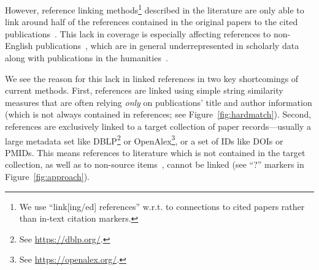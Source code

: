 However, reference linking methods\footnote{We use ``link[ing/ed] references'' w.r.t. to connections to cited papers rather than in-text citation markers.} described in the literature are only able to link around half of the references contained in the original papers to the cited publications~\cite{Lo2020,Saier2020}. This lack in coverage is especially affecting references to non-English publications~\cite{Saier2021}, which are in general underrepresented in scholarly data~\cite{Vera-Baceta2019,Liu2019,Moed2018,Moskaleva2019} along with publications in the humanities~\cite{Colavizza2019,Kellsey2004}.

We see the reason for this lack in linked references in two key shortcomings of current methods.
First, references are linked using simple string similarity measures that are often relying \emph{only} on publications' title and author information (which is not always contained in references; see Figure~\ref{fig:hardmatch}). %
Second, references are exclusively linked to a target collection of paper records---usually a large metadata set like DBLP\footnote{See \url{https://dblp.org/}.} or OpenAlex\footnote{See \url{https://openalex.org/}.}, or a set of IDs like DOIs or PMIDs. This means references to literature which is not contained in the target collection, as well as to non-source items~\cite{Chi2014}, cannot be linked (see ``?'' markers in Figure~\ref{fig:approach}).

